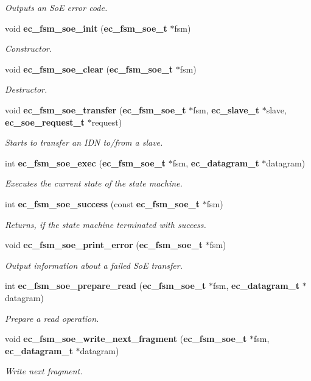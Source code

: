 \begin{DoxyCompactItemize}
\begin{DoxyCompactList}\small\item\em Outputs an So\-E error code. \end{DoxyCompactList}\item 
void {\bf ec\-\_\-fsm\-\_\-soe\-\_\-init} ({\bf ec\-\_\-fsm\-\_\-soe\-\_\-t} $\ast$fsm)
\begin{DoxyCompactList}\small\item\em Constructor. \end{DoxyCompactList}\item 
void {\bf ec\-\_\-fsm\-\_\-soe\-\_\-clear} ({\bf ec\-\_\-fsm\-\_\-soe\-\_\-t} $\ast$fsm)
\begin{DoxyCompactList}\small\item\em Destructor. \end{DoxyCompactList}\item 
void {\bf ec\-\_\-fsm\-\_\-soe\-\_\-transfer} ({\bf ec\-\_\-fsm\-\_\-soe\-\_\-t} $\ast$fsm, {\bf ec\-\_\-slave\-\_\-t} $\ast$slave, {\bf ec\-\_\-soe\-\_\-request\-\_\-t} $\ast$request)
\begin{DoxyCompactList}\small\item\em Starts to transfer an I\-D\-N to/from a slave. \end{DoxyCompactList}\item 
int {\bf ec\-\_\-fsm\-\_\-soe\-\_\-exec} ({\bf ec\-\_\-fsm\-\_\-soe\-\_\-t} $\ast$fsm, {\bf ec\-\_\-datagram\-\_\-t} $\ast$datagram)
\begin{DoxyCompactList}\small\item\em Executes the current state of the state machine. \end{DoxyCompactList}\item 
int {\bf ec\-\_\-fsm\-\_\-soe\-\_\-success} (const {\bf ec\-\_\-fsm\-\_\-soe\-\_\-t} $\ast$fsm)
\begin{DoxyCompactList}\small\item\em Returns, if the state machine terminated with success. \end{DoxyCompactList}\item 
void {\bf ec\-\_\-fsm\-\_\-soe\-\_\-print\-\_\-error} ({\bf ec\-\_\-fsm\-\_\-soe\-\_\-t} $\ast$fsm)
\begin{DoxyCompactList}\small\item\em Output information about a failed So\-E transfer. \end{DoxyCompactList}\item 
int {\bf ec\-\_\-fsm\-\_\-soe\-\_\-prepare\-\_\-read} ({\bf ec\-\_\-fsm\-\_\-soe\-\_\-t} $\ast$fsm, {\bf ec\-\_\-datagram\-\_\-t} $\ast$datagram)
\begin{DoxyCompactList}\small\item\em Prepare a read operation. \end{DoxyCompactList}\item 
void {\bf ec\-\_\-fsm\-\_\-soe\-\_\-write\-\_\-next\-\_\-fragment} ({\bf ec\-\_\-fsm\-\_\-soe\-\_\-t} $\ast$fsm, {\bf ec\-\_\-datagram\-\_\-t} $\ast$datagram)
\begin{DoxyCompactList}\small\item\em Write next fragment. \end{DoxyCompactList}\end{DoxyCompactItemize}
